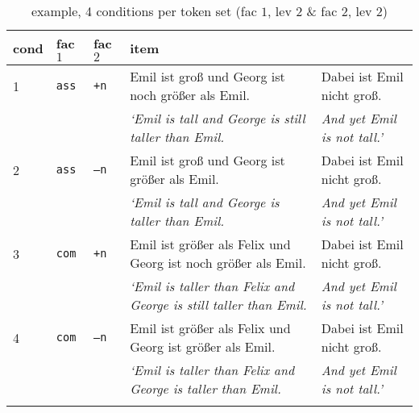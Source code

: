 \documentclass[output=paper,
modfonts
]{langscibook}
\begin{document}
\begin{table}[H]\tiny
\begin{tabular}{lll|ll}
\lsptoprule
cond & fac $1$ & fac $2$ & item & \\
\midrule
1 & \texttt{ass} & \texttt{\footnotesize{+}n} & Emil ist groß \hspace{25pt} und Georg ist noch größer als Emil. & Dabei ist Emil nicht groß. \\
 & & & \textit{`Emil is tall \hspace{32pt} and George is \hspace{0.4pt} still \hspace{2pt} taller than Emil.} & \textit{And yet Emil is not tall.'} \\
\midrule
2 & \texttt{ass} & \texttt{\footnotesize{--}n} & Emil ist groß \hspace{25pt} und Georg ist \hspace{16pt} größer als Emil. & Dabei ist Emil nicht groß. \\
 & & & \textit{`Emil is tall \hspace{32pt} and George is \hspace{19pt} taller than Emil.} & \textit{And yet Emil is not tall.'}   \\
\midrule 
3 & \texttt{com} & \texttt{\footnotesize{+}n} & Emil ist größer als Felix \hspace{0.65pt} und Georg ist noch größer als Emil. & Dabei ist Emil nicht groß.   \\
 & & & \textit{`Emil is taller than Felix \hspace{2pt} and George is \hspace{0.4pt} still \hspace{2pt} taller than Emil.} & \textit{And yet Emil is not tall.'}  \\
\midrule
4 & \texttt{com} & \texttt{\footnotesize{--}n} & Emil ist größer als Felix \hspace{0.65pt} und Georg ist \hspace{16pt} größer als Emil. & Dabei ist Emil nicht groß.   \\
 & & & \textit{`Emil is taller than Felix \hspace{2pt} and George is \hspace{19pt} taller than Emil.} & \textit{And yet Emil is not tall.'}   \\
\lspbottomrule
\end{tabular}
\caption{example, 4 conditions  per token set (fac $1$, lev $2$ \& fac $2$, lev $2$)}
\label{tab:emil_example}
\end{table}
\end{document}
